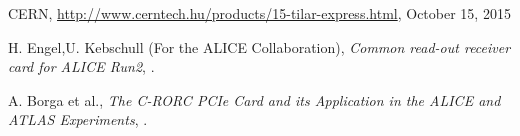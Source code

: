 \documentclass{JINST}
\begin{document}
\begin{thebibliography}{9}
CERN, \url{http://www.cerntech.hu/products/15-tilar-express.html}, October 15, 2015


H. Engel,U. Kebschull (For the ALICE Collaboration),
\emph{Common read-out receiver card for ALICE Run2},
.

A. Borga et al., \emph{The C-RORC PCIe Card and its Application in the ALICE and ATLAS Experiments}, .







\end{thebibliography}
\end{document}
